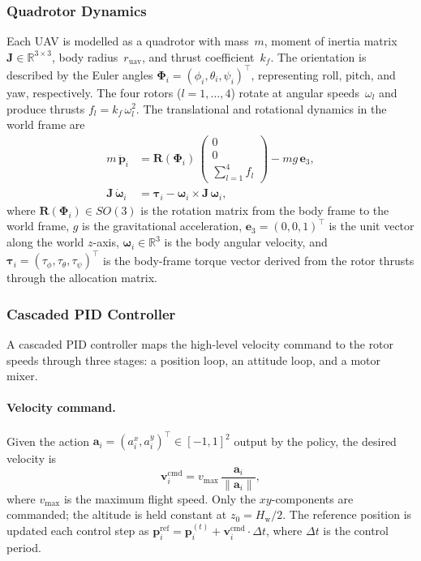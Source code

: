 \subsubsection{Quadrotor Dynamics}

Each UAV is modelled as a quadrotor with mass~$m$, moment of inertia matrix
$\mathbf{J} \in \mathbb{R}^{3 \times 3}$, body radius~$r_{\mathrm{uav}}$, and
thrust coefficient~$k_f$.
The orientation is described by the Euler angles
$\boldsymbol{\Phi}_i = (\phi_i, \theta_i, \psi_i)^{\top}$, representing roll,
pitch, and yaw, respectively.
The four rotors ($l = 1,\dots,4$) rotate at angular speeds~$\omega_l$ and
produce thrusts $f_l = k_f\,\omega_l^2$.
The translational and rotational dynamics in the world frame are
\begin{align}
  m\,\ddot{\mathbf{p}}_i &=
    \mathbf{R}(\boldsymbol{\Phi}_i)\,
    \begin{pmatrix}0\\0\\\sum_{l=1}^{4} f_l\end{pmatrix}
    - mg\,\mathbf{e}_3,
  \label{eq:trans_dyn} \\
  \mathbf{J}\,\dot{\boldsymbol{\omega}}_i &= \boldsymbol{\tau}_i
    - \boldsymbol{\omega}_i \times \mathbf{J}\,\boldsymbol{\omega}_i,
  \label{eq:rot_dyn}
\end{align}
where $\mathbf{R}(\boldsymbol{\Phi}_i) \in SO(3)$ is the rotation matrix from
the body frame to the world frame, $g$ is the gravitational acceleration,
$\mathbf{e}_3 = (0,0,1)^{\top}$ is the unit vector along the world $z$-axis,
$\boldsymbol{\omega}_i \in \mathbb{R}^{3}$ is the body angular velocity, and
$\boldsymbol{\tau}_i = (\tau_\phi, \tau_\theta, \tau_\psi)^{\top}$ is the
body-frame torque vector derived from the rotor thrusts through the allocation
matrix.

\subsubsection{Cascaded PID Controller}

A cascaded PID controller maps the high-level velocity command to the rotor
speeds through three stages: a position loop, an attitude loop, and a motor
mixer.

\paragraph{Velocity command.}
Given the action
$\mathbf{a}_i = (a_i^{x}, a_i^{y})^{\top} \in [-1,1]^{2}$ output by the
policy, the desired velocity is
\begin{equation}
  \mathbf{v}_i^{\mathrm{cmd}} = v_{\max}\,
  \frac{\mathbf{a}_i}{\lVert\mathbf{a}_i\rVert},
  \label{eq:vel_cmd}
\end{equation}
where $v_{\max}$ is the maximum flight speed.
Only the $xy$-components are commanded; the altitude is held constant at
$z_0 = H_{\mathrm{w}}/2$.
The reference position is updated each control step as
$\mathbf{p}_i^{\mathrm{ref}} = \mathbf{p}_i^{(t)} +
\mathbf{v}_i^{\mathrm{cmd}} \cdot \Delta t$,
where $\Delta t$ is the control period.

